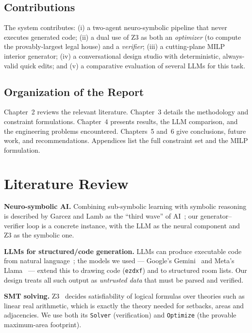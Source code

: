 \documentclass{book}
\begin{document}
\section{Contributions}
The system contributes: (i) a two-agent neuro-symbolic pipeline that never executes generated code; (ii) a dual use of Z3 as both an \emph{optimizer} (to compute the provably-largest legal house) and a \emph{verifier}; (iii) a cutting-plane MILP interior generator; (iv) a conversational design studio with deterministic, always-valid quick edits; and (v) a comparative evaluation of several LLMs for this task.

\section{Organization of the Report}
Chapter~2 reviews the relevant literature. Chapter~3 details the methodology and constraint formulations. Chapter~4 presents results, the LLM comparison, and the engineering problems encountered. Chapters~5 and~6 give conclusions, future work, and recommendations. Appendices list the full constraint set and the MILP formulation.

\chapter{Literature Review}

\textbf{Neuro-symbolic AI.} Combining sub-symbolic learning with symbolic reasoning is described by Garcez and Lamb as the ``third wave'' of AI~\cite{garcez2023neurosymbolic}; our generator--verifier loop is a concrete instance, with the LLM as the neural component and Z3 as the symbolic one.

\textbf{LLMs for structured/code generation.} LLMs can produce executable code from natural language~\cite{chen2021codex}; the models we used --- Google's Gemini~\cite{gemini2024} and Meta's Llama~\cite{llama3} --- extend this to drawing code (\texttt{ezdxf}) and to structured room lists. Our design treats all such output as \emph{untrusted data} that must be parsed and verified.

\textbf{SMT solving.} Z3~\cite{demoura2008z3} decides satisfiability of logical formulas over theories such as linear real arithmetic, which is exactly the theory needed for setbacks, areas and adjacencies. We use both its \texttt{Solver} (verification) and \texttt{Optimize} (the provable maximum-area footprint).
\end{document}
